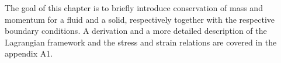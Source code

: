 The goal of this chapter is to briefly introduce conservation of mass and momentum for a fluid and a solid, respectively together with the respective boundary conditions. A derivation and a more detailed description of the Lagrangian framework and the stress and strain relations are covered in the appendix A1.

